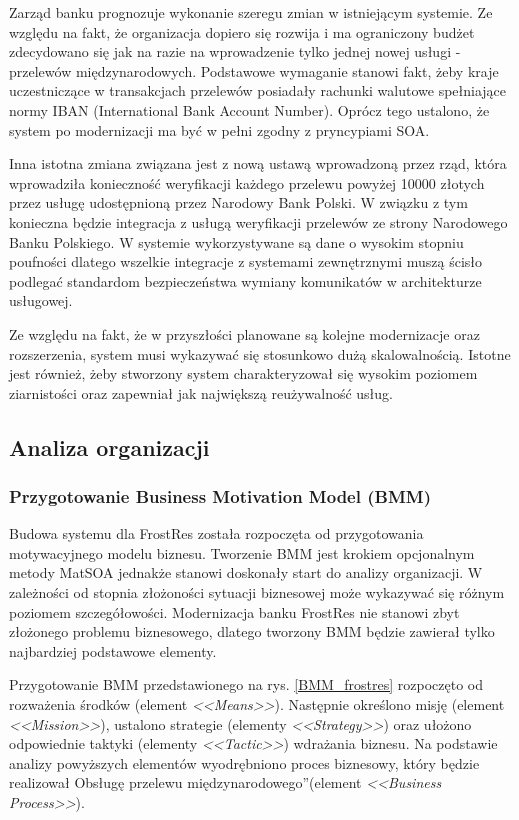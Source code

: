 Zarząd banku prognozuje wykonanie szeregu zmian w istniejącym systemie. Ze względu na fakt, że organizacja dopiero się rozwija i ma ograniczony budżet zdecydowano się jak na razie na wprowadzenie tylko jednej nowej usługi - przelewów międzynarodowych. Podstawowe wymaganie stanowi fakt, żeby kraje uczestniczące w transakcjach przelewów posiadały rachunki walutowe spełniające normy IBAN (International Bank Account Number). Oprócz tego ustalono, że system po modernizacji ma być w pełni zgodny z pryncypiami SOA. 

Inna istotna zmiana związana jest z nową ustawą wprowadzoną przez rząd, która wprowadziła konieczność weryfikacji każdego przelewu powyżej 10000 złotych przez usługę udostępnioną przez Narodowy Bank Polski. W związku z tym konieczna będzie integracja z usługą weryfikacji przelewów ze strony Narodowego Banku Polskiego. W systemie wykorzystywane są dane o wysokim stopniu poufności dlatego wszelkie integracje z systemami zewnętrznymi muszą ścisło podlegać standardom bezpieczeństwa wymiany komunikatów w architekturze usługowej.

Ze względu na fakt, że w przyszłości planowane są kolejne modernizacje oraz rozszerzenia, system musi wykazywać się stosunkowo dużą skalowalnością. Istotne jest również, żeby stworzony system charakteryzował się wysokim poziomem ziarnistości oraz zapewniał jak największą reużywalność usług. 


\subsection{Analiza organizacji}
\subsubsection{Przygotowanie Business Motivation Model (BMM)}
Budowa systemu dla FrostRes została rozpoczęta od przygotowania motywacyjnego modelu biznesu. Tworzenie BMM jest krokiem opcjonalnym metody MatSOA jednakże stanowi doskonały start do analizy organizacji. W zależności od stopnia złożoności sytuacji biznesowej może wykazywać się różnym poziomem szczegółowości. Modernizacja banku FrostRes nie stanowi zbyt złożonego problemu biznesowego, dlatego tworzony BMM będzie zawierał tylko najbardziej podstawowe elementy.

Przygotowanie BMM przedstawionego na rys. \ref{BMM_frostres} rozpoczęto od rozważenia środków (element \emph{<<Means>>}). Następnie określono misję (element \emph{<<Mission>>}), ustalono strategie (elementy \emph{<<Strategy>>}) oraz ułożono odpowiednie taktyki (elementy \emph{<<Tactic>>}) wdrażania biznesu. Na podstawie analizy powyższych elementów wyodrębniono proces biznesowy, który będzie realizował \quotedblbase Obsługę przelewu międzynarodowego\textquotedblright (element \emph{<<Business Process>>}). 

